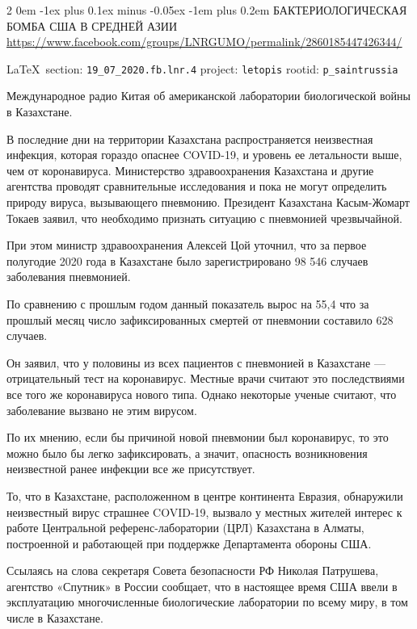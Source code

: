 \documentclass[a4paper,11pt]{extreport}
\makeatletter
\renewcommand\subsection{%
  \clearpage
    \@startsection{subsection}%
    {2}%
    {0em}%
    {-1ex plus 0.1ex minus -0.05ex}%
    {-1em plus 0.2em}%
    {\scshape\bfseries\Large}%
}
\makeatother
\begin{document}
\subsection{БАКТЕРИОЛОГИЧЕСКАЯ БОМБА США В СРЕДНЕЙ АЗИИ}
\label{sec:19_07_2020.fb.lnr.4}
\url{https://www.facebook.com/groups/LNRGUMO/permalink/2860185447426344/}
  
\vspace{0.5cm}
{\small\LaTeX~section: \verb|19_07_2020.fb.lnr.4| project: \verb|letopis| rootid: \verb|p_saintrussia|}
\vspace{0.5cm}


Международное радио Китая об американской лаборатории биологической войны в
Казахстане.

В последние дни на территории Казахстана распространяется неизвестная инфекция,
которая гораздо опаснее COVID-19, и уровень ее летальности выше, чем от
коронавируса. Министерство здравоохранения Казахстана и другие агентства
проводят сравнительные исследования и пока не могут определить природу вируса,
вызывающего пневмонию.  Президент Казахстана Касым-Жомарт Токаев заявил, что
необходимо признать ситуацию с пневмонией чрезвычайной.

При этом министр здравоохранения Алексей Цой уточнил, что за первое полугодие
2020 года в Казахстане было зарегистрировано 98 546 случаев заболевания
пневмонией.

По сравнению с прошлым годом данный показатель вырос на 55,4%
что за прошлый месяц число зафиксированных смертей от пневмонии составило 628
случаев.

Он заявил, что у половины из всех пациентов с пневмонией в Казахстане —
отрицательный тест на коронавирус.  Местные врачи считают это последствиями все
того же коронавируса нового типа. Однако некоторые ученые считают, что
заболевание вызвано не этим вирусом.

По их мнению, если бы причиной новой пневмонии был коронавирус, то это можно
было бы легко зафиксировать, а значит, опасность возникновения неизвестной
ранее инфекции все же присутствует.

То, что в Казахстане, расположенном в центре континента Евразия, обнаружили
неизвестный вирус страшнее COVID-19, вызвало у местных жителей интерес к работе
Центральной референс-лаборатории (ЦРЛ) Казахстана в Алматы, построенной и
работающей при поддержке Департамента обороны США.

Ссылаясь на слова секретаря Совета безопасности РФ Николая Патрушева, агентство
«Спутник» в России сообщает, что в настоящее время США ввели в эксплуатацию
многочисленные биологические лаборатории по всему миру, в том числе в
Казахстане.
\end{document}

